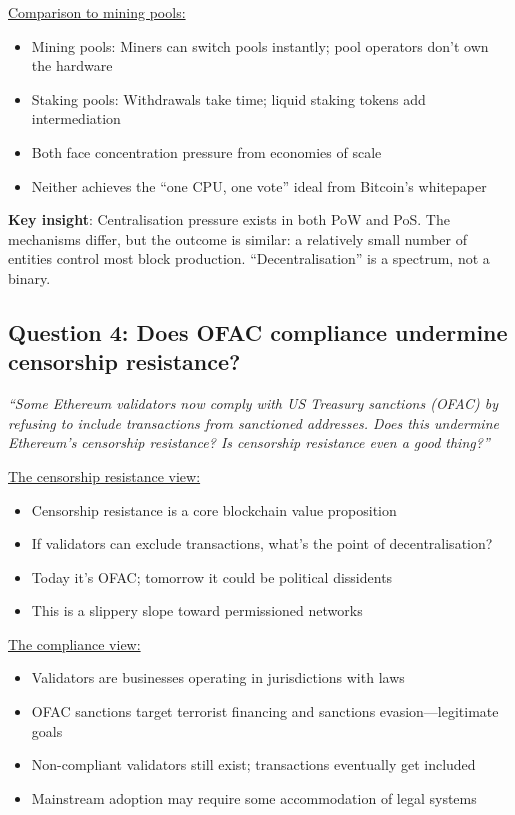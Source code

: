 \documentclass[11pt]{article}
\begin{document}
\medskip
\noindent\underline{Comparison to mining pools:}
\begin{itemize}[leftmargin=*]
\item Mining pools: Miners can switch pools instantly; pool operators don't own the hardware
\item Staking pools: Withdrawals take time; liquid staking tokens add intermediation
\item Both face concentration pressure from economies of scale
\item Neither achieves the ``one CPU, one vote'' ideal from Bitcoin's whitepaper
\end{itemize}

\medskip
\noindent\textbf{Key insight}: Centralisation pressure exists in both PoW and PoS. The mechanisms differ, but the outcome is similar: a relatively small number of entities control most block production. ``Decentralisation'' is a spectrum, not a binary.

\subsection*{Question 4: Does OFAC compliance undermine censorship resistance?}

\textit{``Some Ethereum validators now comply with US Treasury sanctions (OFAC) by refusing to include transactions from sanctioned addresses. Does this undermine Ethereum's censorship resistance? Is censorship resistance even a good thing?''}

\medskip
\noindent\underline{The censorship resistance view:}
\begin{itemize}[leftmargin=*]
\item Censorship resistance is a core blockchain value proposition
\item If validators can exclude transactions, what's the point of decentralisation?
\item Today it's OFAC; tomorrow it could be political dissidents
\item This is a slippery slope toward permissioned networks
\end{itemize}

\medskip
\noindent\underline{The compliance view:}
\begin{itemize}[leftmargin=*]
\item Validators are businesses operating in jurisdictions with laws
\item OFAC sanctions target terrorist financing and sanctions evasion---legitimate goals
\item Non-compliant validators still exist; transactions eventually get included
\item Mainstream adoption may require some accommodation of legal systems
\end{itemize}
\end{document}
